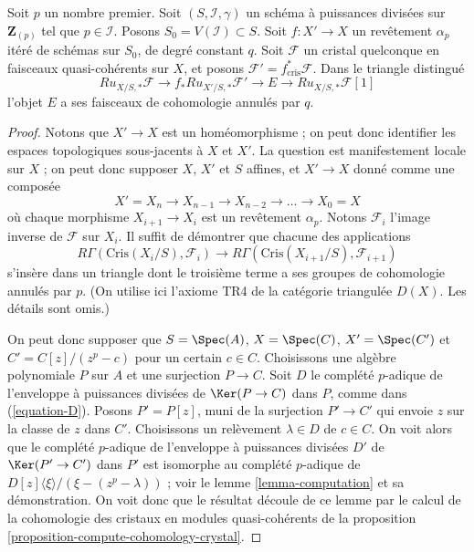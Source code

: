 \begin{lemma}
\label{lemma-pullback-along-p-power-cover}
Soit $p$ un nombre premier. Soit $(S, \mathcal{I}, \gamma)$ un schéma à puissances
divisées sur $\mathbf{Z}_{(p)}$ tel que $p \in \mathcal{I}$. Posons
$S_0 = V(\mathcal{I}) \subset S$. Soit $f : X' \to X$ un revêtement
$\alpha_p$ itéré de schémas sur $S_0$, de degré constant $q$. Soit
$\mathcal{F}$ un cristal quelconque en faisceaux quasi-cohérents sur $X$, et posons
$\mathcal{F}' = f_{\text{cris}}^*\mathcal{F}$.
Dans le triangle distingué
$$
Ru_{X/S, *}\mathcal{F}
\longrightarrow
f_*Ru_{X'/S, *}\mathcal{F}'
\longrightarrow
E
\longrightarrow
Ru_{X/S, *}\mathcal{F}[1]
$$
l'objet $E$ a ses faisceaux de cohomologie annulés par $q$.
\end{lemma}

\begin{proof}
Notons que $X' \to X$ est un homéomorphisme ; on peut donc identifier les espaces
topologiques sous-jacents à $X$ et $X'$. La question est manifestement locale sur $X$ ;
on peut donc supposer $X$, $X'$ et $S$ affines, et $X' \to X$ donné comme une
composée
$$
X' = X_n \to X_{n - 1} \to X_{n - 2} \to \ldots \to X_0 = X
$$
où chaque morphisme $X_{i + 1} \to X_i$ est un revêtement $\alpha_p$.
Notons $\mathcal{F}_i$ l'image inverse de $\mathcal{F}$ sur $X_i$.
Il suffit de démontrer que chacune des applications
$$
R\Gamma(\text{Cris}(X_i/S), \mathcal{F}_i)
\longrightarrow
R\Gamma(\text{Cris}(X_{i + 1}/S), \mathcal{F}_{i + 1})
$$
s'insère dans un triangle dont le troisième terme a ses groupes de cohomologie annulés
par $p$. (On utilise ici l'axiome TR4 de la catégorie triangulée $D(X)$. Les détails sont
omis.)

\medskip\noindent
On peut donc supposer que $S = \Spec(A)$, $X = \Spec(C)$, $X' = \Spec(C')$
et $C' = C[z]/(z^p - c)$ pour un certain $c \in C$. Choisissons une algèbre polynomiale
$P$ sur $A$ et une surjection $P \to C$. Soit $D$ le complété $p$-adique de
l'enveloppe à puissances divisées de $\Ker(P \to C)$ dans $P$, comme dans (\ref{equation-D}).
Posons $P' = P[z]$, muni de la surjection $P' \to C'$ qui envoie $z$ sur la classe de $z$
dans $C'$. Choisissons un relèvement $\lambda \in D$ de $c \in C$. On voit alors que
le complété $p$-adique de l'enveloppe à puissances divisées $D'$ de
$\Ker(P' \to C')$ dans $P'$ est isomorphe au complété $p$-adique de
$D[z]\langle \xi \rangle/(\xi - (z^p - \lambda))$ ; voir le
lemme \ref{lemma-computation} et sa démonstration.
On voit donc que le résultat découle de ce lemme
par le calcul de la cohomologie des cristaux en modules quasi-cohérents de la
proposition \ref{proposition-compute-cohomology-crystal}.
\end{proof}

